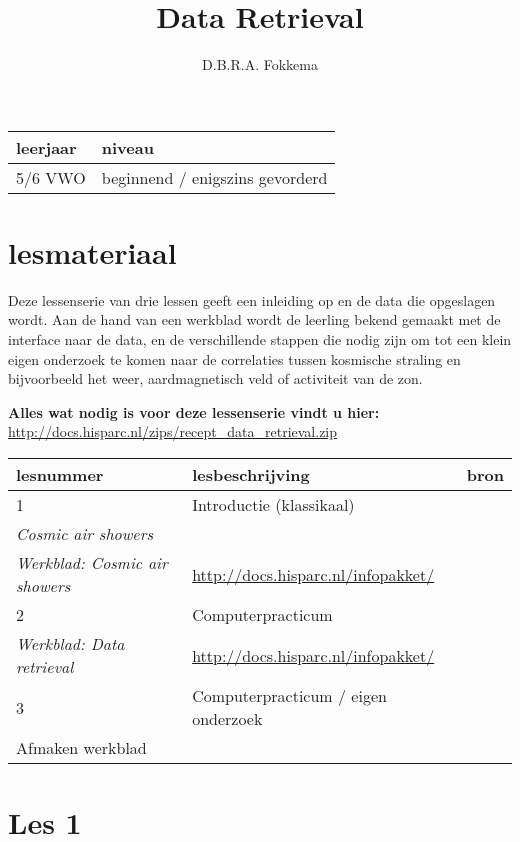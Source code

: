 

\title{Data Retrieval}
\author{D.B.R.A. Fokkema}



\maketitle

\begin{tabular}{|>{\raggedright}p{2.5cm}|>{\raggedright}p{12.5cm}|}
\hline
leerjaar & niveau \tabularnewline
\hline
5/6 VWO & beginnend / enigszins gevorderd\tabularnewline
\hline
\end{tabular}


\section{lesmateriaal}

Deze lessenserie van drie lessen geeft een inleiding op \hisparc en de
data die opgeslagen wordt. Aan de hand van een werkblad wordt de leerling
bekend gemaakt met de interface naar de \hisparc data, en de verschillende
stappen die nodig zijn om tot een klein eigen onderzoek te komen naar de
correlaties tussen kosmische straling en bijvoorbeeld het weer,
aardmagnetisch veld of activiteit van de zon.

\textbf{Alles wat nodig is voor deze lessenserie vindt u hier:}
\url{http://docs.hisparc.nl/zips/recept_data_retrieval.zip}

\begin{tabular}{ |>{\raggedright}p{2.5cm}|>{\raggedright}p{8cm}|>{\raggedright}p{4cm}|}
\hline
lesnummer & lesbeschrijving & bron \tabularnewline
\hline
1 & Introductie (klassikaal) \\
\emph{Cosmic air showers} \\
\emph{Werkblad: Cosmic air showers}
& \url{http://docs.hisparc.nl/infopakket/} \tabularnewline
\hline
2 & Computerpracticum \\
\emph{Werkblad: Data retrieval}
& \url{http://docs.hisparc.nl/infopakket/} \tabularnewline
\hline
3 & Computerpracticum / eigen onderzoek \\
Afmaken werkblad
& \tabularnewline
\hline
\end{tabular}


\section{Les 1}

